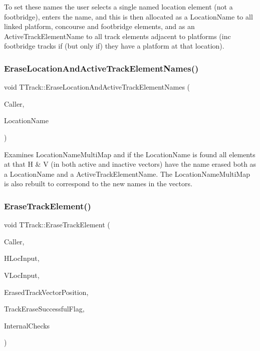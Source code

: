 To set these names the user selects a single named location element (not a footbridge), enters the name, and this is then allocated as a Location\+Name to all linked platform, concourse and footbridge elements, and as an Active\+Track\+Element\+Name to all track elements adjacent to platforms (inc footbridge tracks if (but only if) they have a platform at that location). \mbox{\label{class_t_track_a13a1cc9770c8729d04ad4c0130f91634}} 
\subsubsection{\texorpdfstring{Erase\+Location\+And\+Active\+Track\+Element\+Names()}{EraseLocationAndActiveTrackElementNames()}}
{\footnotesize\ttfamily void T\+Track\+::\+Erase\+Location\+And\+Active\+Track\+Element\+Names (\begin{DoxyParamCaption}\item[{int}]{Caller,  }\item[{Ansi\+String}]{Location\+Name }\end{DoxyParamCaption})}

Examines Location\+Name\+Multi\+Map and if the Location\+Name is found all elements at that H \& V (in both active and inactive vectors) have the name erased both as a Location\+Name and a Active\+Track\+Element\+Name. The Location\+Name\+Multi\+Map is also rebuilt to correspond to the new names in the vectors. \mbox{\label{class_t_track_aa7b58c83ca1743ad3e4607ac0af9c71c}} 
\subsubsection{\texorpdfstring{Erase\+Track\+Element()}{EraseTrackElement()}}
{\footnotesize\ttfamily void T\+Track\+::\+Erase\+Track\+Element (\begin{DoxyParamCaption}\item[{int}]{Caller,  }\item[{int}]{H\+Loc\+Input,  }\item[{int}]{V\+Loc\+Input,  }\item[{int \&}]{Erased\+Track\+Vector\+Position,  }\item[{bool \&}]{Track\+Erase\+Successful\+Flag,  }\item[{bool}]{Internal\+Checks }\end{DoxyParamCaption})}

